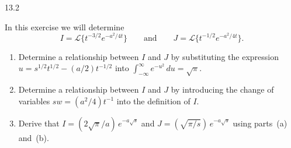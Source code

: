 \begin{exercises}{13.2}
\item In this exercise we will determine
\[
I = \mathcal{L}\{t^{-3/2}e^{-a^2/4t}\}
\qquad\text{and}\qquad
J = \mathcal{L}\{t^{-1/2}e^{-a^2/4t}\}.
\]
\begin{enumerate}
\item[(a)] Determine a relationship between $I$ and $J$ by substituting the expression $u = s^{1/2}t^{1/2} - (a/2)t^{-1/2}$ into $\int_{-\infty}^{\infty} e^{-u^2}\,du = \sqrt{\pi}$.
\item[(b)] Determine a relationship between $I$ and $J$ by introducing the change of variables $sw = (a^2/4)t^{-1}$ into the definition of $I$.
\item[(c)] Derive that $I = (2\sqrt{\pi}/a)\,e^{-a\sqrt{s}}$ and $J = (\sqrt{\pi/s})\,e^{-a\sqrt{s}}$ using parts~(a) and~(b).
\end{enumerate}

\end{exercises}
